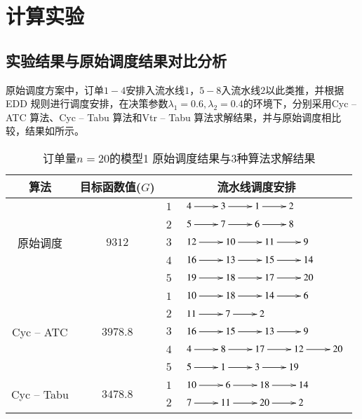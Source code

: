 \chapter{计算实验}
\section{实验结果与原始调度结果对比分析}
原始调度方案中，订单$1-4$安排入流水线$1$，$5-8$入流水线$2$以此类推，并根据EDD 规则进行调度安排，在决策参数$\lambda_1 = 0.6, \lambda_2 = 0.4$的环境下，分别采用Cyc -- ATC 算法、Cyc -- Tabu 算法和Vtr -- Tabu 算法求解结果，并与原始调度相比较，结果如所示。
\begin{table}[h!]
  \centering
  \label{tab:resultmodel1}\caption{订单量$n = 20$的模型1 原始调度结果与$3$种算法求解结果}
    \begin{tabular}{cccl}
    \toprule
    算法    & 目标函数值($G$) & \multicolumn{2}{c}{流水线调度安排} \\
    \midrule
    \multirow{5}[2]{*}{原始调度} & \multirow{5}[2]{*}{$9312$} & $1$
        &  $\xymatrix{4 \ar[r] & 3 \ar[r] & 1 \ar[r] & 2}$\\
         &        & $2$     &  $\xymatrix{5 \ar[r] & 7 \ar[r]& 6 \ar [r]& 8}$\\
         &        & $3$     &  $\xymatrix{12 \ar[r] & 10 \ar[r] & 11 \ar[r] & 9}$\\
         &        & $4$     &  $\xymatrix{16 \ar[r] & 13 \ar[r]& 15 \ar[r] & 14}$\\
         &        & $5$     &  $\xymatrix{19 \ar[r] &18 \ar[r] & 17 \ar[r] &20}$\\
      \hline
    \multirow{5}[2]{*}{Cyc -- ATC} & \multirow{5}[2]{*}{$3978.8$} & $1$     &$\xymatrix{10 \ar[r] & 18 \ar[r] & 14 \ar[r] & 6}$\\
          &       & $2$     &  $\xymatrix{11 \ar[r] & 7 \ar[r] & 2}$\\
          &       & $3$     &  $\xymatrix{16 \ar[r] & 15 \ar[r] & 13 \ar[r] & 9}$\\
          &       & $4$     &  $\xymatrix{4 \ar[r] & 8 \ar[r] & 17 \ar[r] & 12 \ar[r]&20}$\\
          &       & $5$     &  $\xymatrix{5 \ar[r] & 1 \ar[r] & 3 \ar[r] & 19}$\\
     \hline
    \multirow{5}[2]{*}{Cyc -- Tabu} & \multirow{5}[2]{*}{$3478.8$} & $1$     &  $\xymatrix{10 \ar[r] & 6 \ar[r] & 18 \ar[r] & 14}$\\
          &       & $2$     & $\xymatrix{7 \ar[r] & 11 \ar[r] & 20 \ar[r] & 2}$ \\

\end{tabular}
\end{table}
